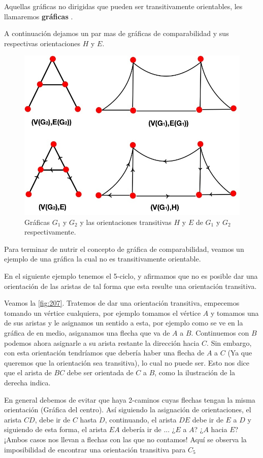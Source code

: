 Aquellas gráficas no dirigidas que pueden ser transitivamente orientables, les
llamaremos \textbf{gráficas} .

A continuación dejamos un par mas de gráficas de comparabilidad y sus
respectivas orientaciones $H$ y $E$.

\begin{figure}[H]
  \centering
  \includegraphics[width=0.6 \textwidth]{recursos/capturas/206.jpg}
  \caption{Gráficas $G_1$ y $G_2$ y las orientaciones transitivas $H$ y $E$ de $G_1$ y $G_2$ respectivamente.}
  \label{fig:206}
\end{figure}

Para terminar de nutrir el concepto de gráfica de comparabilidad, veamos un
ejemplo de una gráfica la cual no es transitivamente orientable.

En el siguiente ejemplo tenemos el 5-ciclo, y afirmamos que no es posible dar
una orientación de las aristas de tal forma que esta resulte una orientación
transitiva.
    
Veamos la \cref{fig:207}. Tratemos de dar una orientación transitiva, empecemos
tomando un vértice cualquiera, por ejemplo tomamos el vértice $A$ y tomamos una
de sus aristas y le asignamos un sentido a esta, por ejemplo como se ve en la
gráfica de en medio, asiganamos una flecha que va de $A$ a $B$. Continuemos con
$B$ podemos ahora asignarle a su arista restante la dirección hacia $C$. Sin
embargo, con esta orientación tendríamos que debería haber una flecha de $A$ a
$C$ (Ya que queremos que la orientación sea transitiva), lo cual no puede ser.
Esto nos dice que el arista de $BC$ debe ser orientada de $C$ a $B$, como la
ilustración de la derecha indica.
    
En general debemos de evitar que haya 2-caminos cuyas  flechas tengan la misma
orientación (Gráfica del centro). Así siguiendo la asignación de orientaciones,
el arista $CD$, debe ir de $C$ hasta $D$, continuando, el arista $DE$ debe ir de
$E$ a $D$ y siguiendo de esta forma, el arista $EA$ debería ir de ... ¿$E$ a
$A$? ¿$A$ hacia $E$? ¡Ambos casos nos llevan a flechas con las que no contamos!
Aquí se observa la imposibilidad de encontrar una orientación transitiva para
$C_5$

